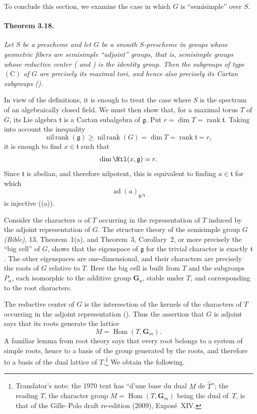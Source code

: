 
To conclude this section, we examine the case in which \(G\) is
``semisimple'' over \(S\).

\paragraph{\textbf{Theorem 3.18.}}
{\itshape Let \(S\) be a prescheme and let \(G\) be a smooth
\(S\)-prescheme in groups whose geometric fibers are semisimple
``adjoint'' groups, that is, semisimple groups whose reductive
center \textup{( and )} is the identity group. Then the
subgroups of type \((\mathrm C)\) of \(G\) are precisely its
maximal tori, and hence also precisely its Cartan subgroups
\textup{()}.}

In view of the definitions, it is enough to treat the case where
\(S\) is the spectrum of an algebraically closed field. We must
then show that, for a maximal torus \(T\) of \(G\), its Lie algebra
\(\mathfrak t\) is a Cartan subalgebra of \(\mathfrak g\). Put
\(r=\dim T=\operatorname{rank}\mathfrak t\). Taking into account
the inequality
\[
  \operatorname{nil\,rank}(\mathfrak g)
  \geq
  \operatorname{nil\,rank}(G)
  =
  \dim T
  =
  \operatorname{rank}\mathfrak t
  =
  r,
\]
it is enough to find \(x\in\mathfrak t\) such that
\[
  \dim\Nil(x,\mathfrak g)=r.
\]
Since \(\mathfrak t\) is abelian, and therefore nilpotent, this is
equivalent to finding \(a\in\mathfrak t\) for which
\[
  \operatorname{ad}(a)_{\mathfrak g/\mathfrak t}
\]
is injective \textup{(\textup{(a)})}.

Consider the characters \(\alpha\) of \(T\) occurring in the
representation of \(T\) induced by the adjoint representation of
\(G\). The structure theory of the semisimple group \(G\)
\textup{\emph{(Bible)}, 13, Theorem~1\textup{(a)}, and Theorem~3,
Corollary~2}, or more precisely the ``big cell'' of \(G\), shows
that the eigenspace of \(\mathfrak g\) for the trivial character is
exactly \(\mathfrak t\). The other eigenspaces are
one-dimensional, and their characters are precisely the roots of
\(G\) relative to \(T\). Here the big cell is built from \(T\) and
the subgroups \(P_\alpha\), each isomorphic to the additive group
\(\mathbf G_a\), stable under \(T\), and corresponding to the root
characters.

The reductive center of \(G\) is the intersection of the kernels
of the characters of \(T\) occurring in the adjoint representation
\textup{()}. Thus the assertion that \(G\) is adjoint says
that its roots generate the lattice
\[
  M=\operatorname{Hom}(T,\mathbf G_m).
\]
A familiar lemma from root theory says that every root belongs to
a system of simple roots, hence to a basis of the group generated
by the roots, and therefore to a basis of the dual lattice of
\(T\).\footnote{Translator's note: the 1970 text has ``d'une base du dual \(M\) de \(\widehat T\)''; the reading \(T\), the character group \(M=\operatorname{Hom}(T,\mathbf G_m)\) being the dual of~\(T\), is that of the Gille--Polo draft re-edition (2009), Exposé~XIV.} We obtain the following.

